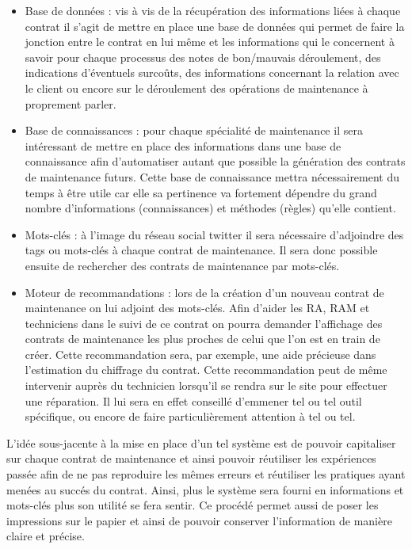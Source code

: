 \begin{itemize}
\item Base de données : vis à vis de la récupération des informations liées à chaque contrat il s'agit de mettre en place une base de données qui permet de faire la jonction entre le contrat en lui même et les informations qui le concernent à savoir pour chaque processus des notes de bon/mauvais déroulement, des indications d'éventuels surcoûts, des informations concernant la relation avec le client ou encore sur le déroulement des opérations de maintenance à proprement parler.
\item Base de connaissances : pour chaque spécialité de maintenance il sera intéressant de mettre en place des informations dans une base de connaissance afin d'automatiser autant que possible la génération des contrats de maintenance futurs. Cette base de connaissance mettra nécessairement du temps à être utile car elle sa pertinence va fortement dépendre du grand nombre d'informations (connaissances) et méthodes (règles) qu'elle contient.
\item Mots-clés : à l'image du réseau social twitter il sera nécessaire d'adjoindre des \og tags \fg ou mots-clés à chaque contrat de maintenance. Il sera donc possible ensuite de rechercher des contrats de maintenance par mots-clés.
\item Moteur de recommandations : lors de la création d'un nouveau contrat de maintenance on lui adjoint des mots-clés. Afin d'aider les RA, RAM et techniciens dans le suivi de ce contrat on pourra demander l'affichage des contrats de maintenance les plus proches de celui que l'on est en train de créer. Cette recommandation sera, par exemple, une aide précieuse dans l'estimation du chiffrage du contrat. Cette recommandation peut de même intervenir auprès du technicien lorsqu'il se rendra sur le site pour effectuer une réparation. Il lui sera en effet conseillé d'emmener tel ou tel outil spécifique, ou encore de faire particulièrement attention à tel ou tel.
\end{itemize}

L'idée sous-jacente à la mise en place d'un tel système est de pouvoir capitaliser sur chaque contrat de maintenance et ainsi pouvoir réutiliser les expériences passée afin de ne pas reproduire les mêmes erreurs et réutiliser les pratiques ayant menées au succés du contrat. Ainsi, plus le système sera fourni en informations et mots-clés plus son utilité se fera sentir. Ce procédé permet aussi de \og poser les impressions sur le papier \fg et ainsi de pouvoir conserver l'information de manière claire et précise.

